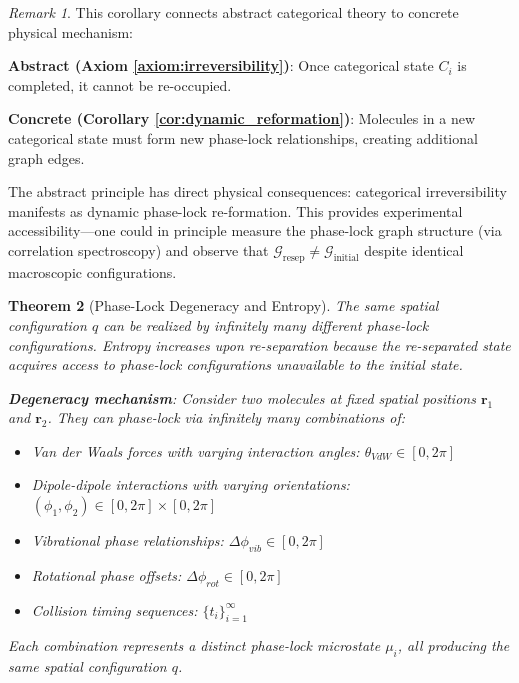 \documentclass[12pt,a4paper]{article}
\newtheorem{theorem}{Theorem}[section]
\theoremstyle{remark}
\newtheorem{remark}[theorem]{Remark}
\begin{document}
\begin{remark}
This corollary connects abstract categorical theory to concrete physical mechanism:

\textbf{Abstract (Axiom \ref{axiom:irreversibility})}: Once categorical state $C_i$ is completed, it cannot be re-occupied.

\textbf{Concrete (Corollary \ref{cor:dynamic_reformation})}: Molecules in a new categorical state must form new phase-lock relationships, creating additional graph edges.

The abstract principle has direct physical consequences: categorical irreversibility manifests as dynamic phase-lock re-formation. This provides experimental accessibility—one could in principle measure the phase-lock graph structure (via correlation spectroscopy) and observe that $\mathcal{G}_{\text{resep}} \neq \mathcal{G}_{\text{initial}}$ despite identical macroscopic configurations.
\end{remark}

\begin{theorem}[Phase-Lock Degeneracy and Entropy]
\label{thm:phase_lock_degeneracy}
The same spatial configuration $q$ can be realized by infinitely many different phase-lock configurations. Entropy increases upon re-separation because the re-separated state acquires access to phase-lock configurations unavailable to the initial state.

\textbf{Degeneracy mechanism}: Consider two molecules at fixed spatial positions $\mathbf{r}_1$ and $\mathbf{r}_2$. They can phase-lock via infinitely many combinations of:
\begin{itemize}
\item Van der Waals forces with varying interaction angles: $\theta_{VdW} \in [0, 2\pi]$
\item Dipole-dipole interactions with varying orientations: $(\phi_1, \phi_2) \in [0, 2\pi] \times [0, 2\pi]$
\item Vibrational phase relationships: $\Delta\phi_{vib} \in [0, 2\pi]$
\item Rotational phase offsets: $\Delta\phi_{rot} \in [0, 2\pi]$
\item Collision timing sequences: $\{t_i\}_{i=1}^{\infty}$
\end{itemize}

Each combination represents a distinct phase-lock microstate $\mu_i$, all producing the same spatial configuration $q$.
\end{theorem}
\end{document}

